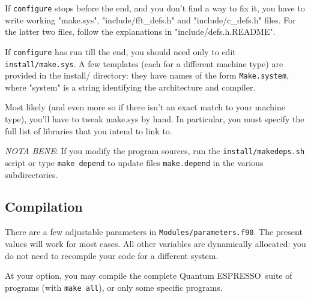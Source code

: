\documentclass[12pt,a4paper]{article}
\def\qe{{\sc Quantum ESPRESSO}}
\begin{document}
If \texttt{configure} stops before the end, and you don't find a way to fix
it, you have to write working "make.sys", "include/fft\_defs.h" and
"include/c\_defs.h" files. 
For the latter two files, follow the explanations in 
"include/defs.h.README". 

If \texttt{configure} has run till the end, you should need only to
edit \texttt{install/make.sys}. A few templates (each for a different 
machine type)
are provided in the install/ directory: they have names of the
form \texttt{Make.system}, where "system" is a string identifying the 
architecture and compiler.
  
Most likely (and even more so if there isn't an exact match to your 
machine type), you'll have to tweak make.sys by hand. In particular, 
you must
specify the full list of libraries that you intend to link to.
    
{\em NOTA BENE}:
If you modify the program sources, run the
\texttt{install/makedeps.sh}  script  or type \texttt{make depend} 
to update files \texttt{make.depend} in the various 
subdirectories.

\subsection{Compilation}

There are a few adjustable parameters in \texttt{Modules/parameters.f90}. 
The
present values will work for most cases. All other variables are dynamically
allocated: you do not need to recompile your code for a different system.
    
At your option, you may compile the complete \qe\ suite of programs 
(with \texttt{make all}), or only some specific programs.
\end{document}
